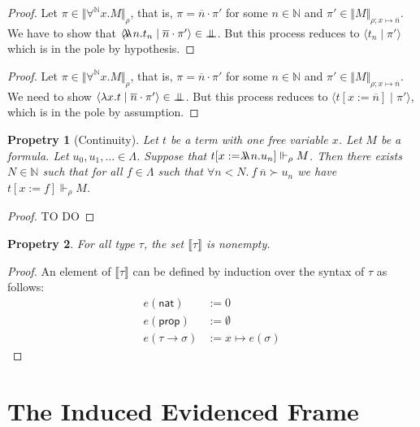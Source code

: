 \documentclass{article}
\newcommand{\N}{\mathbb{N}}
\newcommand{\nat}{\mathsf{nat}}
\newcommand{\proc}[2]{\langle{#1}\mid{#2}\rangle}
\newcommand{\depforall}[1]{\forall^\N #1.}
\newcommand{\pole}{{\bot\mkern-10mu\bot}}
\newcommand{\realizes}{\Vdash}
\newcommand{\oracle}[2]{\lambda\mkern-15mu\lambda\ #1. #2}
\newcommand{\prop}{\mathsf{prop}}
\newcommand{\typeinterp}[1]{{\llbracket #1 \rrbracket}}
\newcommand{\terminterp}[2]{\Vert #1 \Vert_{#2}}
\newtheorem{property}{Propetry}
\begin{document}
\begin{proof}
    Let $\pi \in \terminterp{\depforall{x} M}{\rho}$, that is, $\pi = \overline{n} \cdot \pi'$ for some $n \in \N$ and $\pi' \in \terminterp{M}{\rho; x \mapsto \overline{n}}$.
    We have to show that $\proc{\oracle{n}{t_n}}{\overline{n} \cdot \pi'} \in \pole$.
    But this process reduces to $\proc{t_n}{\pi'}$ which is in the pole by hypothesis.
\end{proof}

\begin{proof}
    Let $\pi \in \terminterp{\depforall{x} M}{\rho}$, that is, $\pi = \overline{n} \cdot \pi'$ for some $n \in \N$ and $\pi' \in \terminterp{M}{\rho; x \mapsto \overline{n}}$.
    We need to show $\proc{\lambda x. t}{\overline{n} \cdot \pi'} \in \pole$.
    But this process reduces to $\proc{t[x := \overline{n}]}{\pi'}$, which is in the pole by assumption.
\end{proof}

\begin{property}[Continuity]
    Let $t$ be a term with one free variable $x$.
    Let $M$ be a formula.
    Let $u_0, u_1, \dots \in \Lambda$.
    Suppose that $t[x := \oracle{n}{u_n}] \realizes_\rho M$.
    Then there exists $N \in \N$ such that for all $f \in \Lambda$ such that $\forall n < N.\ f\ \overline{n} \succ u_n$ we have $t[x := f] \realizes_\rho M$.
\end{property}

\begin{proof}
    TO DO
\end{proof}

\begin{property}\label{typeinterpnonempty}
    For all type $\tau$, the set $\typeinterp{\tau}$ is nonempty.
\end{property}

\begin{proof}
    An element of $\typeinterp{\tau}$ can be defined by induction over the syntax of $\tau$ as follows:
    \begin{align*}
        e(\nat) & := 0 \\
        e(\prop) & := \emptyset \\
        e(\tau \rightarrow \sigma) & := x \mapsto e(\sigma)
    \end{align*}
\end{proof}

\section{The Induced Evidenced Frame}
\end{document}
